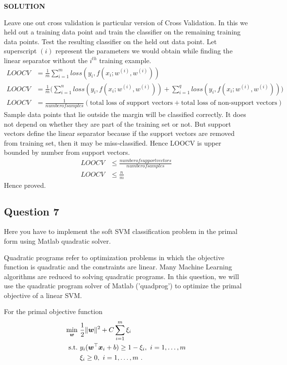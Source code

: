 \documentclass{article}
\begin{document}
\textbf{SOLUTION}
\begin{mdframed}[backgroundcolor=lightgray]
Leave one out cross validation is particular version of Cross Validation. In this we held out a training data point and train the classifier on the remaining training data points. Test the resulting classifier on the held out data point. Let superscript $(i)$ represent the parameters we would obtain while finding the linear separator without the $i^{th}$ training example.
\begin{align*}
    LOOCV &= \frac{1}{m} \sum_{i=1}^m loss(y_i, f(x_i; w^{(i)}, w^{(i)} ))\\
    LOOCV &= \frac{1}{m} \big (\sum_{i=1}^n loss(y_i, f(x_i; w^{(i)}, w^{(i)} )) + \sum_{i=1}^q loss(y_i, f(x_i; w^{(i)}, w^{(i)} ))\big)\\
    LOOCV &= \frac{1}{number of samples} (\text{total loss of support vectors} + \text{total loss of non-support vectors})
\end{align*}
Sample data points that lie outside the margin will be classified correctly. It does not depend on whether they are part of the training set or not. But support vectors define the linear separator because if the support vectors are removed from training set, then it may be miss-classified. Hence LOOCV is upper bounded by number from support vectors.\\
\begin{align*}
    LOOCV &\leq \frac{number of support vectors}{number of samples}\\
    LOOCV &\leq \frac{n}{m}
\end{align*}
Hence proved.
\end{mdframed}

\subsection{Question 7}
Here you have to implement the soft SVM classification problem in the primal form using Matlab quadratic solver.

Quadratic programs refer to optimization problems in which the objective function is quadratic and the constraints are linear. Many Machine Learning algorithms are reduced to solving quadratic programs. In this question, we will use the quadratic program solver of Matlab ('quadprog') to optimize the primal objective of a linear SVM.

For the primal objective function
\begin{equation}
\begin{split}
\label{eq:svm}
\min_{\boldsymbol{w}} \ & \frac{1}{2}\|\boldsymbol{w}\|^2 + C \sum_{i=1}^m \xi_i \\
\text{s.t.} \ & y_i(\boldsymbol{w}^\top\boldsymbol{x}_i+b) \geq 1- \xi_i, \ i=1, \ldots, m \\
& \xi_i\geq 0, \ i=1, \ldots, m~.
\end{split}
\end{equation}
\end{document}
